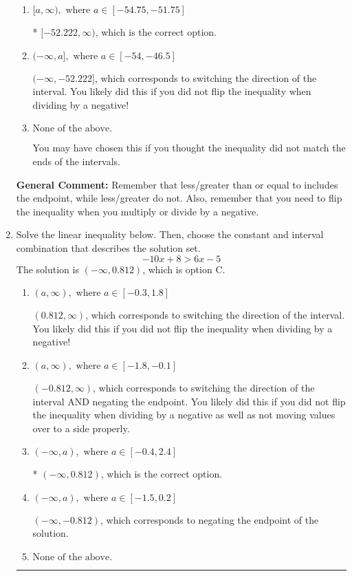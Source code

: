 \documentclass{extbook}[14pt]
\newcommand{\litem}[1]{\item #1

\rule{\textwidth}{0.4pt}}
\begin{document}
\begin{enumerate}
{\begin{enumerate}[label=\Alph*.]
 $[52.222, \infty)$, which corresponds to negating the endpoint of the solution.
\item \( [a, \infty), \text{ where } a \in [-54.75, -51.75] \)

* $[-52.222, \infty)$, which is the correct option.
\item \( (-\infty, a], \text{ where } a \in [-54, -46.5] \)

 $(-\infty, -52.222]$, which corresponds to switching the direction of the interval. You likely did this if you did not flip the inequality when dividing by a negative!
\item \( \text{None of the above}. \)

You may have chosen this if you thought the inequality did not match the ends of the intervals.
\end{enumerate}

\textbf{General Comment:} Remember that less/greater than or equal to includes the endpoint, while less/greater do not. Also, remember that you need to flip the inequality when you multiply or divide by a negative.
}
\litem{
Solve the linear inequality below. Then, choose the constant and interval combination that describes the solution set.
\[ -10x + 8 > 6x -5 \]The solution is \( (-\infty, 0.812) \), which is option C.\begin{enumerate}[label=\Alph*.]
\item \( (a, \infty), \text{ where } a \in [-0.3, 1.8] \)

 $(0.812, \infty)$, which corresponds to switching the direction of the interval. You likely did this if you did not flip the inequality when dividing by a negative!
\item \( (a, \infty), \text{ where } a \in [-1.8, -0.1] \)

 $(-0.812, \infty)$, which corresponds to switching the direction of the interval AND negating the endpoint. You likely did this if you did not flip the inequality when dividing by a negative as well as not moving values over to a side properly.
\item \( (-\infty, a), \text{ where } a \in [-0.4, 2.4] \)

* $(-\infty, 0.812)$, which is the correct option.
\item \( (-\infty, a), \text{ where } a \in [-1.5, 0.2] \)

 $(-\infty, -0.812)$, which corresponds to negating the endpoint of the solution.
\item \( \text{None of the above}. \)


\end{enumerate}}
\end{enumerate}
\end{document}
